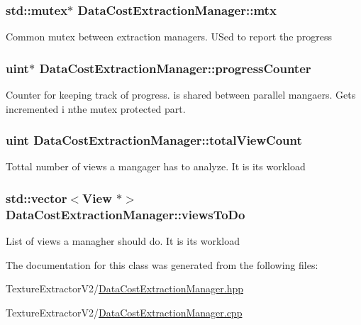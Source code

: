 \subsubsection[{mtx}]{\setlength{\rightskip}{0pt plus 5cm}std\+::mutex$\ast$ Data\+Cost\+Extraction\+Manager\+::mtx}\label{class_data_cost_extraction_manager_a701cc390cea498e7477cd2e06cf48e01}
Common mutex between extraction managers. U\+Sed to report the progress \hypertarget{class_data_cost_extraction_manager_a97997e576d25554a8805934a81382d38}{}
\subsubsection[{progress\+Counter}]{\setlength{\rightskip}{0pt plus 5cm}uint$\ast$ Data\+Cost\+Extraction\+Manager\+::progress\+Counter}\label{class_data_cost_extraction_manager_a97997e576d25554a8805934a81382d38}
Counter for keeping track of progress. is shared between parallel mangaers. Gets incremented i nthe mutex protected part. \hypertarget{class_data_cost_extraction_manager_ad2cbdefd98fdde78bf62b5602befa9e5}{}
\subsubsection[{total\+View\+Count}]{\setlength{\rightskip}{0pt plus 5cm}uint Data\+Cost\+Extraction\+Manager\+::total\+View\+Count}\label{class_data_cost_extraction_manager_ad2cbdefd98fdde78bf62b5602befa9e5}
Tottal number of views a mangager has to analyze. It is its workload \hypertarget{class_data_cost_extraction_manager_afec2fa6aa627fb80c2734b4c5f895afa}{}
\subsubsection[{views\+To\+Do}]{\setlength{\rightskip}{0pt plus 5cm}std\+::vector$<${\bf View} $\ast$$>$ Data\+Cost\+Extraction\+Manager\+::views\+To\+Do}\label{class_data_cost_extraction_manager_afec2fa6aa627fb80c2734b4c5f895afa}
List of views a managher should do. It is its workload 

The documentation for this class was generated from the following files\+:\begin{DoxyCompactItemize}
\item 
Texture\+Extractor\+V2/\hyperlink{_data_cost_extraction_manager_8hpp}{Data\+Cost\+Extraction\+Manager.\+hpp}\item 
Texture\+Extractor\+V2/\hyperlink{_data_cost_extraction_manager_8cpp}{Data\+Cost\+Extraction\+Manager.\+cpp}\end{DoxyCompactItemize}
